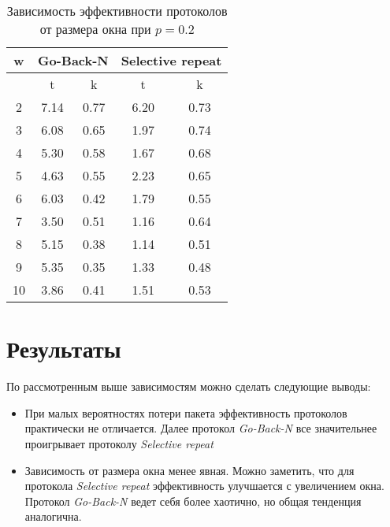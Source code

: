 \documentclass[a4paper,12pt]{article}
\begin{document}
\begin{table}[ht!]
    \begin{center}
        \caption{Зависимость эффективности протоколов от размера
        окна при $p=0.2$}\label{tab:2}
        \begin{tabular}{|c|c|c|c|c|}
        \hline
        w & \multicolumn{2}{|c|}{Go-Back-N} & \multicolumn{2}{|c|}{Selective repeat}\\
        \hline
          & t & k & t & k \\ 
        \hline
        2	 & 7.14  & 0.77    & 6.20  & 0.73   \\ \hline
        3	 & 6.08  & 0.65    & 1.97  & 0.74   \\ \hline
        4	 & 5.30  & 0.58    & 1.67  & 0.68   \\ \hline
        5	 & 4.63  & 0.55    & 2.23  & 0.65   \\ \hline
        6	 & 6.03  & 0.42    & 1.79  & 0.55   \\ \hline
        7	 & 3.50  & 0.51    & 1.16  & 0.64   \\ \hline
        8	 & 5.15  & 0.38    & 1.14  & 0.51   \\ \hline
        9	 & 5.35  & 0.35    & 1.33  & 0.48   \\ \hline
        10	 & 3.86  & 0.41    & 1.51  & 0.53   \\ \hline
        \end{tabular}
    \end{center}
\end{table}

\begin{figure}[ht!]
\begin{minipage}[h]{0.5\linewidth}
\end{minipage}
\hfill
\begin{minipage}[h]{0.5\linewidth}
\end{minipage}
\end{figure} 

\section{Результаты}

По рассмотренным выше зависимостям можно сделать следующие выводы:

\begin{itemize}
    \item При малых вероятностях потери пакета эффективность протоколов 
        практически не отличается. Далее протокол \textit{Go-Back-N} все
        значительнее проигрывает протоколу \textit{Selective repeat}
    \item Зависимость от размера окна менее явная. Можно заметить, что для
        протокола \textit{Selective repeat} эффективность улучшается с
        увеличением окна. Протокол \textit{Go-Back-N} ведет себя более
        хаотично, но общая тенденция аналогична.
\end{itemize}
\end{document}
